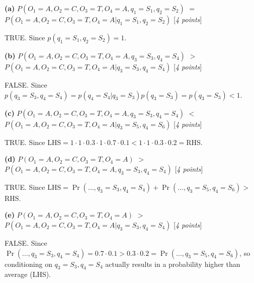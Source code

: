 \documentclass[11pt]{article}
\newcounter{marks}
\def\maxmarks#1{\extramark{#1}\addtocounter{marks}{#1}}
\def\extramark#1{\hfill
  [\emph{#1 points}]
}
\renewcommand{\part}[1] {\vspace{.10in} {\bf (#1)}}
\begin{document}
\part{a}
$P(O_1=A, O_2=C, O_3=T, O_4=A, q_1=S_1, q_2=S_2)$ $=$\\$P(O_1=A, O_2=C, O_3=T, O_4=A|q_1=S_1, q_2=S_2)$
\maxmarks{4} \vspace{0 cm}

{\color{blue} TRUE. Since $p(q_1=S_1,q_2=S_2)=1$. }

\part{b}
$P(O_1=A, O_2=C, O_3=T, O_4=A, q_3=S_3, q_4=S_4)$ $>$ \\$P(O_1=A, O_2=C, O_3=T, O_4=A|q_3=S_3, q_4=S_4)$
\maxmarks{4} \vspace{0 cm}		

{\color{blue} FALSE. Since $p(q_3=S_3,q_4=S_4)=p(q_4=S_4|q_3=S_3)p(q_3=S_3)=p(q_3=S_3)<1$. }

\part{c}
$P(O_1=A, O_2=C, O_3=T, O_4=A, q_3=S_3, q_4=S_4)$ $<$ \\$P(O_1=A, O_2=C, O_3=T, O_4=A|q_3=S_5, q_4=S_6)$
\maxmarks{4} \vspace{0 cm}

{\color{blue} TRUE. Since LHS${}=1\cdot1\cdot0.3\cdot1\cdot0.7\cdot0.1<
1\cdot1\cdot0.3\cdot0.2={}$RHS}. 

\part{d}
$P(O_1=A, O_2=C, O_3=T, O_4=A)$ $>$ $P(O_1=A, O_2=C, O_3=T, O_4=A, q_3=S_3, q_4=S_4)$
\maxmarks{4} \vspace{0 cm}

{\color{blue} TRUE. Since LHS${}=\Pr(\dots,q_3=S_3,q_4=S_4)+\Pr(\dots,q_3=S_5,q_4=S_6)>{}$RHS. }

\part{e}
$P(O_1=A, O_2=C, O_3=T, O_4=A)$ $>$ $P(O_1=A, O_2=C, O_3=T, O_4=A|q_3=S_3, q_4=S_4)$
\maxmarks{4} \vspace{0 cm}

{\color{blue} FALSE. Since $\Pr(\dots,q_3=S_3,q_4=S_4)=0.7\cdot0.1
>0.3\cdot0.2=\Pr(\dots,q_3=S_5,q_4=S_6)$, so conditioning on $q_3=S_3,q_4=S_4$
actually results in a probability higher than average (LHS). }
\end{document}
